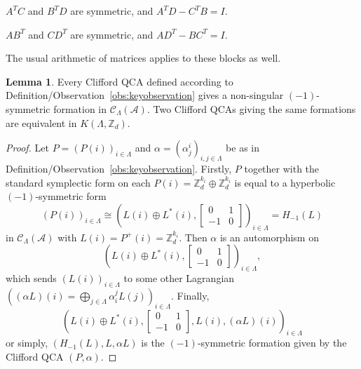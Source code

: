 \documentclass{article}
\theoremstyle{definition}
\newtheorem{lem}[theorem]{Lemma}
\newcommand{\CA}{{ \mathcal A}}
\newcommand{\ZZ}{{\mathbb Z}}
\begin{document}
$A^{  T}C$ and $B^{  T}D$ are symmetric, and $A^{  T}D - C^{  T}B = I$.

$AB^{  T}$ and $CD^{  T}$ are symmetric, and $AD^{  T} - BC^{  T} = I$.

The usual arithmetic of matrices applies to these blocks as well. 


\begin{lem}\label{lem: isom}
    Every Clifford QCA defined according to Definition/Observation~\ref{obs:keyobservation} gives a non-singular $(-1)$-symmetric formation in $\mathcal{C}_{\Lambda}(\CA)$. Two Clifford QCAs giving the same formations are equivalent in $K(\Lambda, \ZZ_d)$.

\end{lem}
\begin{proof}
    Let \(P=(P(i))_{i \in \Lambda}\) and \(\alpha=(\alpha_j^i)_{i,j \in \Lambda}\) be as in Definition/Observation~\ref{obs:keyobservation}. Firstly, $P$ together with the standard symplectic form  on each $P(i)=\ZZ_d^{k_i}\oplus \ZZ_d^{k_i}$ is equal to a hyperbolic $(-1)$-symmetric form  $$(P(i))_{i\in \Lambda}\cong\left(L(i)\oplus L^*(i), \begin{bmatrix}
        0 & 1\\
        -1 & 0
    \end{bmatrix}\right)_{i\in \Lambda}=H_{-1}(L)$$ in $\mathcal C_{\Lambda}(\CA)$ with $L(i)=P^+(i)=\ZZ_d^{k_i}.$
Then $\alpha$ is an automorphism on $$\left(L(i)\oplus L^*(i), \begin{bmatrix}
        0 & 1\\
        -1 & 0
    \end{bmatrix}\right)_{i\in \Lambda},$$ which sends $(L(i))_{i\in \Lambda}$ to some other Lagrangian $\left((\alpha L)(i)=\bigoplus_{j\in \Lambda}\alpha_{i}^j L(j)\right)_{i\in \Lambda}.$ Finally, 
    $$\left(L(i)\oplus L^*(i), \begin{bmatrix}
        0 & 1\\
        -1 & 0
    \end{bmatrix}, L(i), (\alpha L)(i)  \right)_{i\in \Lambda}$$ or simply, $(H_{-1}(L), L, \alpha L)$ is the $(-1)$-symmetric formation given by the Clifford QCA $(P, \alpha)$.


\end{proof}
\end{document}
